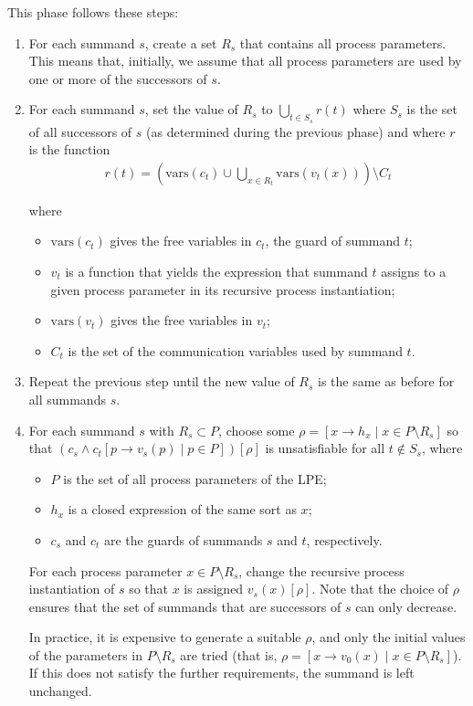 This phase follows these steps:

\begin{enumerate}

\item For each summand $s$, create a set $R_s$ that contains all process parameters.
This means that, initially, we assume that all process parameters are used by one or more of the successors of $s$.

\item For each summand $s$, set the value of $R_s$ to $\bigcup\limits_{t \in S_s}^{} r(t)$ where $S_s$ is the set of all successors of $s$ (as determined during the previous phase) and where $r$ is the function
\begin{align*}
r(t) = \left( \text{vars}(c_t) \cup \bigcup\limits_{x \in R_t}^{} \text{vars}(v_t(x)) \right) \setminus C_t
\end{align*}

where

\begin{itemize}
\item $\text{vars}(c_t)$ gives the free variables in $c_t$, the guard of summand $t$;
\item $v_t$ is a function that yields the expression that summand $t$ assigns to a given process parameter in its recursive process instantiation;
\item $\text{vars}(v_t)$ gives the free variables in $v_t$;
\item $C_t$ is the set of the communication variables used by summand $t$.
\end{itemize}

\item Repeat the previous step until the new value of $R_s$ is the same as before for all summands $s$.

\item For each summand $s$ with $R_s \subset P$, choose some $\rho = [x \rightarrow h_x \;|\; x \in P \setminus R_s]$ so that $({c_s} \land {c_t}[p \rightarrow v_s(p) \;|\; p \in P])[\rho]$ is unsatisfiable for all $t \notin S_s$, where

\begin{itemize}
\item $P$ is the set of all process parameters of the LPE;
\item $h_x$ is a closed expression of the same sort as $x$;
\item $c_s$ and $c_t$ are the guards of summands $s$ and $t$, respectively.
\end{itemize}

For each process parameter $x \in P \setminus R_s$, change the recursive process instantiation of $s$ so that $x$ is assigned $v_s(x)[\rho]$.
Note that the choice of $\rho$ ensures that the set of summands that are successors of $s$ can only decrease.

In practice, it is expensive to generate a suitable $\rho$, and only the initial values of the parameters in $P \setminus R_s$ are tried (that is, $\rho = [x \rightarrow v_0(x) \;|\; x \in P \setminus R_s]$).
If this does not satisfy the further requirements, the summand is left unchanged.

\end{enumerate}

